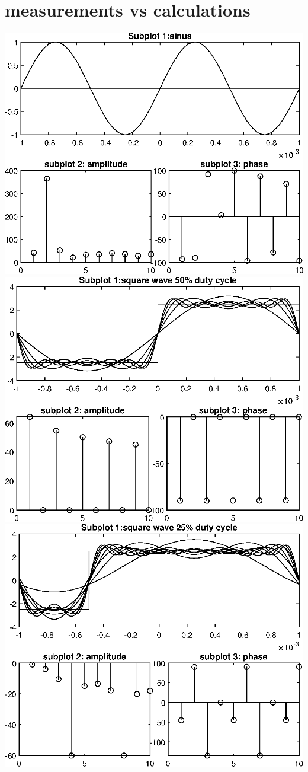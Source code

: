 \documentclass[notitlepage, a4paper, 11pt]{article}
\begin{document}
	\section{measurements vs calculations}
	\begin{center}
		\includegraphics{../Matlab/img/sin}
		\includegraphics{../Matlab/img/sqr50}
		\includegraphics{../Matlab/img/sqr25}

\end{center}
\end{document}
